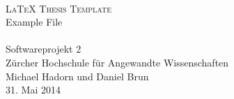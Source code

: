 
\begin{titlepage}
 	\mbox{}\vspace{5\baselineskip}\\
 	\sffamily\huge
 	\centering
 	\textsc{\LaTeX{} Thesis Template} \\[2ex]
    Example File
    \rmfamily\Large
    \vspace{1\baselineskip}\\
    \mbox{}
    \vspace{3\baselineskip}\\
 	\rmfamily\Large
 	Softwareprojekt 2 \\ Zürcher Hochschule für Angewandte Wissenschaften
 	\vspace{2\baselineskip}\\
 	\rmfamily\Large
 	Michael Hadorn und Daniel Brun
 	\vspace{1\baselineskip}\\
 	31. Mai 2014
\end{titlepage}

